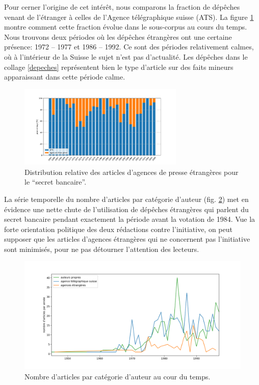 \documentclass[11pt]{article}
\begin{document}
Pour cerner l'origine de cet intérêt, nous comparons la fraction de
dépêches venant de l'étranger à celles de l'Agence télégraphique suisse
(ATS). La figure \ref{percentage1} montre comment cette fraction évolue
dans le sous-corpus au cours du temps. Nous trouvons deux périodes où
les dépêches étrangères ont une certaine présence: 1972 -- 1977 et 1986
-- 1992. Ce sont des périodes relativement calmes, où à l'intérieur de
la Suisse le sujet n'est pas d'actualité. Les dépêches dans le collage
\ref{depeches} représentent bien le type d'article sur des faits mineurs
apparaissant dans cette période calme.

\begin{figure}
\centering
\includegraphics[width=0.7\textwidth ]{analysis/agency_percentage.png}
\caption{\label{percentage1} Distribution relative des articles
d'agences de presse étrangères pour le ``secret bancaire''.}
\end{figure}

La série temporelle du nombre d'articles par catégorie d'auteur (fig.
\ref{categorie}) met en évidence une nette chute de l'utilisation de
dépêches étrangères qui parlent du secret bancaire pendant exactement la
période avant la votation de 1984. Vue la forte orientation politique
des deux rédactions contre l'initiative, on peut supposer que les
articles d'agences étrangères qui ne concernent pas l'initiative sont
minimisés, pour ne pas détourner l'attention des lecteurs.

\begin{figure}
\centering
\includegraphics[width=1\textwidth ]{analysis/authors_agency_count.png}
\caption{\label{categorie} Nombre d'articles par catégorie d'auteur au
cour du temps.}
\end{figure}
\end{document}
